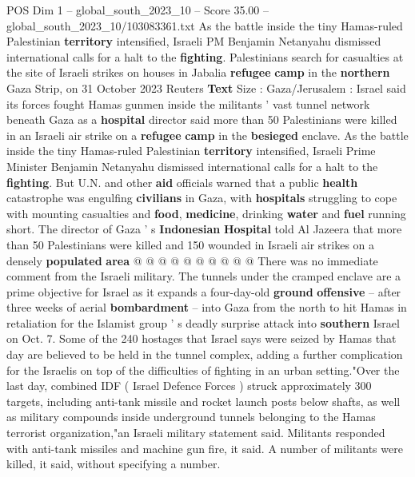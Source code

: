 \begin{textsample}{POS Dim 1 – global\_south\_2023\_10 – Score 35.00 – global\_south\_2023\_10/103083361.txt}  \label{ex:f1_pos_187}
As the battle inside the tiny Hamas-ruled Palestinian \textbf{territory} intensified, Israeli PM Benjamin Netanyahu dismissed international calls for a halt to the \textbf{fighting}.
Palestinians search for casualties at the site of Israeli strikes on houses in Jabalia \textbf{refugee} \textbf{camp} in the \textbf{northern} Gaza Strip, on 31 October 2023 Reuters \textbf{Text} Size : Gaza/Jerusalem : Israel said its forces fought Hamas gunmen inside the militants ' vast tunnel network beneath Gaza as a \textbf{hospital} director said more than 50 Palestinians were killed in an Israeli air strike on a \textbf{refugee} \textbf{camp} in the \textbf{besieged} enclave.
As the battle inside the tiny Hamas-ruled Palestinian \textbf{territory} intensified, Israeli Prime Minister Benjamin Netanyahu dismissed international calls for a halt to the \textbf{fighting}.
But U.N. and other \textbf{aid} officials warned that a public \textbf{health} catastrophe was engulfing \textbf{civilians} in Gaza, with \textbf{hospitals} struggling to cope with mounting casualties and \textbf{food}, \textbf{medicine}, drinking \textbf{water} and \textbf{fuel} running short.
The director of Gaza ' s \textbf{Indonesian} \textbf{Hospital} told Al Jazeera that more than 50 Palestinians were killed and 150 wounded in Israeli air strikes on a densely \textbf{populated} \textbf{area} @ @ @ @ @ @ @ @ @ @ There was no immediate comment from the Israeli military.
The tunnels under the cramped enclave are a prime objective for Israel as it expands a four-day-old \textbf{ground} \textbf{offensive} -- after three weeks of aerial \textbf{bombardment} -- into Gaza from the north to hit Hamas in retaliation for the Islamist group ' s deadly surprise attack into \textbf{southern} Israel on Oct. 7.
Some of the 240 hostages that Israel says were seized by Hamas that day are believed to be held in the tunnel complex, adding a further complication for the Israelis on top of the difficulties of fighting in an urban setting."Over the last day, combined IDF ( Israel Defence Forces ) struck approximately 300 targets, including anti-tank missile and rocket launch posts below shafts, as well as military compounds inside underground tunnels belonging to the Hamas terrorist organization,"an Israeli military statement said.
Militants responded with anti-tank missiles and machine gun fire, it said.
A number of militants were killed, it said, without specifying a number.

\end{textsample}
